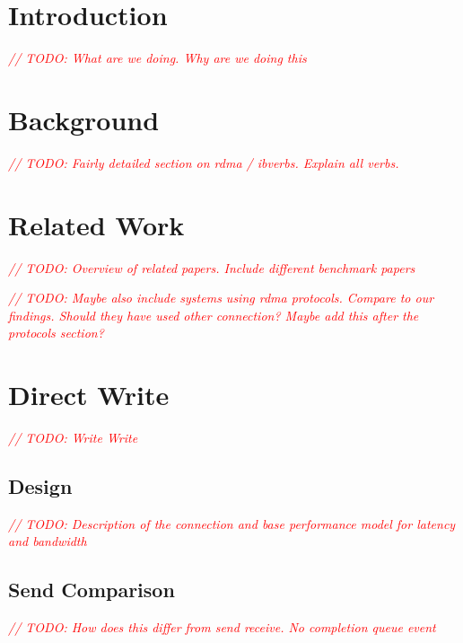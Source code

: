 \documentclass{article}
\newcommand{\todo}[1]{\textit{\textcolor{red}{// TODO: #1} }}
\theoremstyle{plain}
\theoremstyle{definition}
\theoremstyle{remark}
\begin{document}
\iffalse
\fi
\newcommand{\seqnode}[3][]{ 
  \node[#1] (#2) {#3};
  \node[below of=#2, node distance=5cm] (#2_g) {};
  \draw (#2) -- (#2_g);
}
\newcommand{\hseqnode}[3][]{ 
  \node[#1] (#2) {#3};
  \node[below of=#2, node distance=5cm] (#2_g) {};
}
\newcommand{\msg}[5][above]{
  \draw[->] ($(#2)!#4!(#2_g)$) -- node[#1,scale=0.75,midway]{#5} ($(#3)!#4+0.04!(#3_g)$);
}
\newcommand{\fetch}[4]{
  \draw[-] ($(#1)!#3-0.04!(#1_g)$) -- node[above,scale=0.75,midway]{#4} ($(#2)!#3!(#2_g)$);
  \draw[->] ($(#2)!#3!(#2_g)$) -- node[above,scale=0.75,midway]{} ($(#1)!#3+0.04!(#1_g)$);
}

\tableofcontents
\pagebreak
\section{Introduction}
\todo{What are we doing. Why are we doing this}

\pagebreak
\section{Background}
\todo{Fairly detailed section on rdma / ibverbs. Explain all verbs.}


\pagebreak
\section{Related Work}

\todo{Overview of related papers. Include different benchmark papers}

\todo{Maybe also include systems using rdma protocols. Compare to our findings. Should they have used other connection? 
Maybe add this after the protocols section?}

\pagebreak


\pagebreak

\pagebreak


\pagebreak


\pagebreak


\pagebreak
\section{Direct Write}
\todo{Write Write}
\subsection{Design}
\todo{Description of the connection and base performance model for latency and bandwidth}
\subsection{Send Comparison}
\todo{How does this differ from send receive. No completion queue event}
\end{document}
